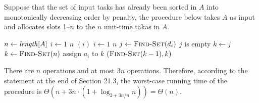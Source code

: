 \documentclass[fleqn]{article}
\begin{document}
\begin{enumerate}
Suppose that the set of input tasks has already been sorted in $A$
into monotonically decreasing order by penalty, the procedure below
takes $A$ as input and allocates slots 1--$n$ to the $n$ unit-time
takas in $A$.

\begin{codebox}
\li $n \gets \id{length}[A]$
\li \For $i \gets 1$ \To $n$    \label{li:sv-1st-for-begin}
\li   \Do
        $(i)$
      \End                      \label{li:sv-1st-for-end}
\li \For $i \gets 1$ \To $n$    \label{li:sv-2nd-for-begin}
\li   \Do
        $j \gets \textnormal{\scshape Find-Set}(d_i)$
\li     \If $j$ is empty
\li       \Then
            $k \gets j$
\li       \Else
            $k \gets \textnormal{\scshape Find-Set}(n)$
          \End
\li     assign $a_i$ to $k$
\li     {}$(\textnormal{\scshape Find-Set}(k-1), k)$
      \End                      \label{li:sv-2nd-for-end}
\end{codebox}

There are $n$  operations and at most $3n$
 operations. Therefore, according to the statement at
the end of Section 21.3, the worst-case running time of the
 procedure is $\Theta(n + 3n \cdot (1 +
\log_{2+3n/n}n)) = \Theta(n)$.

\end{enumerate}
\end{document}

